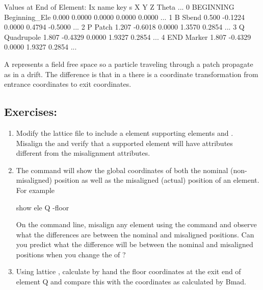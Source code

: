 \documentclass{hitec}     %
\begin{document}
{\begin{code}
      Values at End of Element:
Ix  name      key               s          X         Y         Z     Theta ...
 0  BEGINNING Beginning_Ele  0.000    0.0000    0.0000    0.0000    0.0000 ...
 1  B         Sbend          0.500   -0.1224    0.0000    0.4794   -0.5000 ...
 2  P         Patch          1.207   -0.6018    0.0000    1.3570    0.2854 ...
 3  Q         Quadrupole     1.807   -0.4329    0.0000    1.9327    0.2854 ...
 4  END       Marker         1.807   -0.4329    0.0000    1.9327    0.2854 ...
\end{code}

A  represents a field free space so a particle traveling through a patch propagate as in a
drift. The difference is that in a  there is a coordinate transformation from entrance
coordinates to exit coordinates.

\subsection{Exercises:}

\begin{enumerate}[leftmargin=*]
\item
Modify the lattice file  to include a  element supporting elements 
and . Misalign the  and verify that a supported element will have 
attributes different from the misalignment attributes.
%
\item
The  command will show the global coordinates of both the nominal (non-misaligned) position
as well as the misaligned (actual) position of an element. For example
\begin{code}
show ele Q -floor
\end{code}
On the \tao command line, misalign any element using the  command and observe what the differences are between  the nominal and misaligned positions. Can you predict what the difference will be between the nominal and misaligned positions when you change the  of ?
%
\item
Using lattice , calculate by hand the floor coordinates at the exit end of element Q and compare this with the coordinates as calculated by Bmad.
\end{enumerate}

\newpage

}
\end{document}
